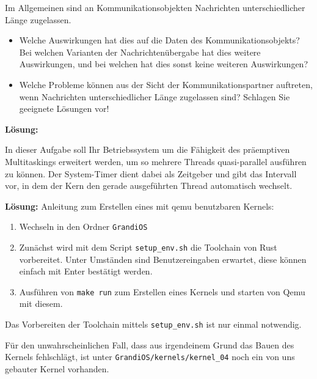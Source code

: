 

\begin{description}

Im Allgemeinen sind an Kommunikationsobjekten Nachrichten unterschiedlicher Länge zugelassen.
    \begin{itemize}
      \item Welche Auswirkungen hat dies auf die Daten des Kommunikationsobjekts? Bei welchen Varianten der Nachrichtenübergabe hat dies weitere Auswirkungen, und bei welchen hat dies sonst keine weiteren Auswirkungen?
      \item Welche Probleme können aus der Sicht der Kommunikationspartner auftreten, wenn Nachrichten unterschiedlicher Länge zugelassen sind? Schlagen Sie geeignete Lösungen vor!
    \end{itemize}

\textbf{Lösung:}


In  dieser  Aufgabe  soll  Ihr  Betriebssystem  um  die  Fähigkeit  des  präemptiven  Multitaskings erweitert  werden,  um  so  mehrere  Threads  quasi-parallel  ausführen  zu  können.  Der  System-Timer dient  dabei  als  Zeitgeber  und  gibt  das  Intervall  vor,  in  dem  der  Kern  den  gerade ausgeführten Thread automatisch wechselt. 

\textbf{Lösung:}
Anleitung zum Erstellen eines mit qemu benutzbaren Kernels:
\begin{enumerate}
  \item Wechseln in den Ordner \texttt{GrandiOS}
  \item Zunächst wird mit dem Script \texttt{setup\_env.sh} die Toolchain von Rust vorbereitet. Unter Umständen sind Benutzereingaben erwartet, diese können einfach mit Enter bestätigt werden.
  \item Ausführen von \texttt{make run} zum Erstellen eines Kernels und starten von Qemu mit diesem.
\end{enumerate}
Das Vorbereiten der Toolchain mittels \texttt{setup\_env.sh} ist nur einmal notwendig.

Für den unwahrscheinlichen Fall, dass aus irgendeinem Grund das Bauen des Kernels fehlschlägt, ist unter {\texttt{GrandiOS/kernels/kernel\_04}} noch ein von uns gebauter Kernel vorhanden.


\end{description}
